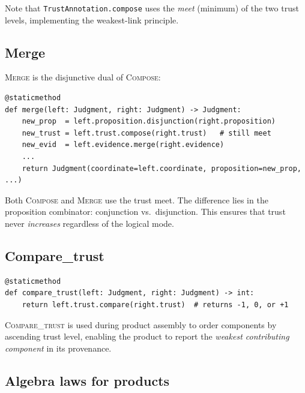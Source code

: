 \documentclass[11pt]{article}
\begin{document}
Note that \texttt{TrustAnnotation.compose} uses the \emph{meet} (minimum)
of the two trust levels, implementing the weakest-link principle.

\subsection{Merge}

\textsc{Merge} is the disjunctive dual of \textsc{Compose}:

\begin{lstlisting}[style=jugeo-python, caption={JudgmentAlgebra.merge.},
  label=lst:merge]
@staticmethod
def merge(left: Judgment, right: Judgment) -> Judgment:
    new_prop  = left.proposition.disjunction(right.proposition)
    new_trust = left.trust.compose(right.trust)   # still meet
    new_evid  = left.evidence.merge(right.evidence)
    ...
    return Judgment(coordinate=left.coordinate, proposition=new_prop, ...)
\end{lstlisting}

\begin{remark}
Both \textsc{Compose} and \textsc{Merge} use the trust meet.  The
difference lies in the proposition combinator: conjunction vs.\ disjunction.
This ensures that trust never \emph{increases} regardless of the logical
mode.
\end{remark}

\subsection{Compare\_trust}

\begin{lstlisting}[style=jugeo-python, caption={JudgmentAlgebra.compare\_trust.},
  label=lst:compare]
@staticmethod
def compare_trust(left: Judgment, right: Judgment) -> int:
    return left.trust.compare(right.trust)  # returns -1, 0, or +1
\end{lstlisting}

\textsc{Compare\_trust} is used during product assembly to order
components by ascending trust level, enabling the product to report
the \emph{weakest contributing component} in its provenance.

\subsection{Algebra laws for products}
\end{document}
